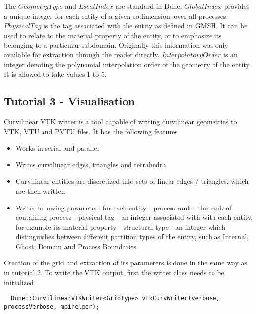 The $GeometryType$ and $LocalIndex$ are standard in Dune. $GlobalIndex$ provides a unique integer for each entity of a given codimension, over all processes. $PhysicalTag$ is the tag associated with the entity as defined in GMSH. It can be used to relate to the material property of the entity, or to emphasize its belonging to a particular subdomain. Originally this information was only available for extraction through the reader directly. $InterpolatoryOrder$ is an integer denoting the polynomial interpolation order of the geometry of the entity. It is allowed to take values 1 to 5. \\






\subsection{Tutorial 3 - Visualisation}

Curvilinear VTK writer is a tool capable of writing curvilinear geometries to VTK, VTU and PVTU files. It has the following features
\begin{itemize}
	\item Works in serial and parallel
	\item Writes curvilinear edges, triangles and tetrahedra
	\item Curvilinear entities are discretized into sets of linear edges / triangles, which are then written
	\item Writes following parameters for each entity
	  \subitem - process rank    - the rank of containing process
	  \subitem - physical tag    - an integer associated with with each entity, for example its material property
	  \subitem - structural type - an integer which distinguishes between different partition types of the entity, such as Internal, Ghost, Domain and Process Boundaries
\end{itemize}

\noindent
Creation of the grid and extraction of its parameters is done in the same way as in tutorial 2. To write the VTK output, first the writer class needs to be initialized \\

\begin{mybox}
\begin{lstlisting}
  Dune::CurvilinearVTKWriter<GridType> vtkCurvWriter(verbose, processVerbose, mpihelper);
\end{lstlisting}
\end{mybox}

